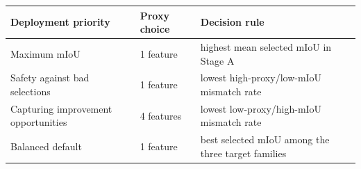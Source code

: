 \begin{tabular}{p{}p{}p{}}
\toprule
Deployment priority & Proxy choice & Decision rule \\
\midrule
Maximum mIoU & 1 feature & highest mean selected mIoU in Stage A \\
Safety against bad selections & 1 feature & lowest high-proxy/low-mIoU mismatch rate \\
Capturing improvement opportunities & 4 features & lowest low-proxy/high-mIoU mismatch rate \\
Balanced default & 1 feature & best selected mIoU among the three target families \\
\bottomrule
\end{tabular}

